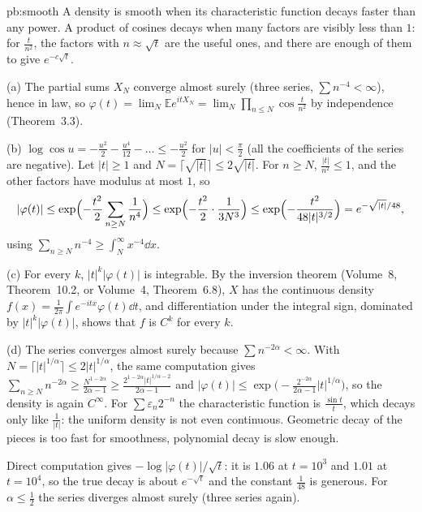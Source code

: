 \begin{solution}{pb:smooth}
\idea A density is smooth when its characteristic function decays faster than any power. A product of cosines decays when many factors are visibly less than $1$:
for $\frac t{n^2}$, the factors with $n\approx\sqrt t$ are the useful ones, and there are enough of them to give $e^{-c\sqrt t}$.

\writeup (a) The partial sums $X_N$ converge almost surely (three series, $\sum n^{-4}<\infty$), hence in law, so $\varphi(t)=\lim_N\mathbb Ee^{itX_N}=\lim_N\prod_{n\le N}\cos\frac t{n^2}$
by independence (Theorem~3.3).

(b) $\log\cos u=-\frac{u^2}2-\frac{u^4}{12}-\dots\le-\frac{u^2}2$ for $|u|<\frac\pi2$ (all the coefficients of the series are negative). Let $|t|\ge1$ and $N=\lceil\sqrt{|t|}\rceil\le2\sqrt{|t|}$. For
$n\ge N$, $\frac{|t|}{n^2}\le1$, and the other factors have modulus at most $1$, so
\[
|\varphi(t)|\le\exp\Bigl(-\frac{t^2}2\sum_{n\ge N}\frac1{n^4}\Bigr)\le\exp\Bigl(-\frac{t^2}2\cdot\frac1{3N^3}\Bigr)\le\exp\Bigl(-\frac{t^2}{48|t|^{3/2}}\Bigr)=e^{-\sqrt{|t|}/48},
\]
using $\sum_{n\ge N}n^{-4}\ge\int_N^\infty x^{-4}\dd x$.

(c) For every $k$, $|t|^k|\varphi(t)|$ is integrable. By the inversion theorem (Volume~8, Theorem~10.2, or Volume~4, Theorem~6.8), $X$ has the continuous density
$f(x)=\frac1{2\pi}\int e^{-itx}\varphi(t)\dd t$, and differentiation under the integral sign, dominated by $|t|^k|\varphi(t)|$, shows that $f$ is $C^k$ for every $k$.

(d) The series converges almost surely because $\sum n^{-2\alpha}<\infty$. With $N=\lceil|t|^{1/\alpha}\rceil\le2|t|^{1/\alpha}$, the same computation gives
$\sum_{n\ge N}n^{-2\alpha}\ge\frac{N^{1-2\alpha}}{2\alpha-1}\ge\frac{2^{1-2\alpha}|t|^{1/\alpha-2}}{2\alpha-1}$ and
$|\varphi(t)|\le\exp\bigl(-\frac{2^{-2\alpha}}{2\alpha-1}|t|^{1/\alpha}\bigr)$, so the density is again $C^\infty$. For $\sum\varepsilon_n2^{-n}$ the characteristic function is
$\frac{\sin t}t$, which decays only like $\frac1{|t|}$: the uniform density is not even continuous. Geometric decay of the pieces is too fast for smoothness, polynomial decay is
slow enough.

\leads Direct computation gives $-\log|\varphi(t)|/\sqrt t$: it is $1.06$ at $t=10^3$ and $1.01$ at $t=10^4$, so the true decay is about $e^{-\sqrt t}$ and the constant $\frac1{48}$ is
generous. For $\alpha\le\frac12$ the series diverges almost surely (three series again).
\end{solution}

